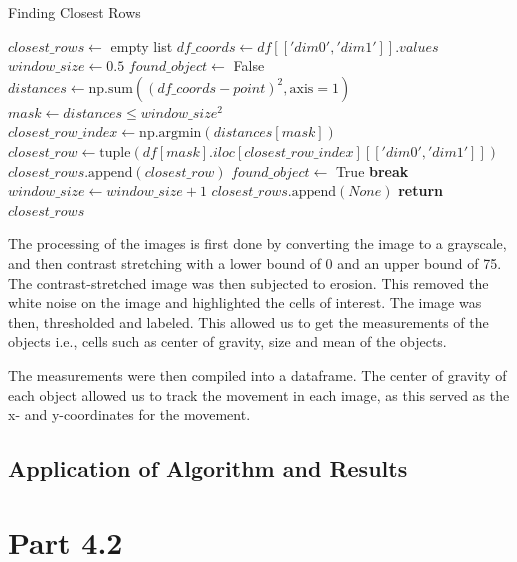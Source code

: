 \documentclass{article}
\begin{document}
\begin{algorithm}[h!]
\caption{Finding Closest Rows}\label{algo:find-closest-rows}
\begin{algorithmic}[1]
    \State $closest\_rows \gets$ empty list
    \State $df\_coords \gets df[['dim0', 'dim1']].values$
        \State $window\_size \gets 0.5$
        \State $found\_object \gets$ False
            \State $distances \gets \text{np.sum}((df\_coords - point)^2, \text{axis}=1)$
            \State $mask \gets distances \leq window\_size^2$
                \State $closest\_row\_index \gets \text{np.argmin}(distances[mask])$
                \State $closest\_row \gets \text{tuple}(df[mask].iloc[closest\_row\_index][['dim0', 'dim1']])$
                \State $closest\_rows.\text{append}(closest\_row)$
                \State $found\_object \gets$ True
                \State \textbf{break}
            \EndIf
            \State $window\_size \gets window\_size + 1$
        \EndWhile
            \State $closest\_rows.\text{append}(None)$  
        \EndIf
    \EndFor
    \State \textbf{return} $closest\_rows$
\EndFunction
\end{algorithmic}
\end{algorithm}
\par The processing of the images is first done by converting the image to a grayscale, and then contrast stretching with a lower bound of 0 and an upper bound of 75. The contrast-stretched image was then subjected to erosion. This removed the white noise on the image and highlighted the cells of interest. The image was then, thresholded and labeled. This allowed us to get the measurements of the objects i.e., cells such as center of gravity, size and mean of the objects. 
\par The measurements were then compiled into a dataframe. The center of gravity of each object allowed us to track the movement in each image, as this served as the x- and y-coordinates for the movement. 
\subsection*{Application of Algorithm and Results}

\section*{Part 4.2}
\end{document}

